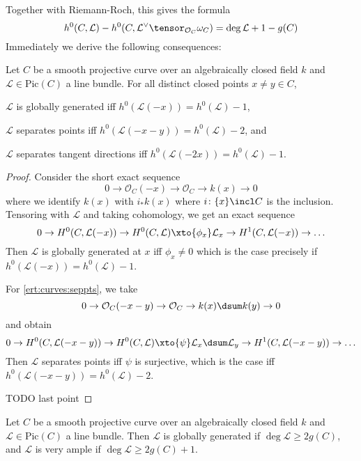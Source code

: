\documentclass[wip, algebra]{bsteffan-lecturenotes}
\newcommand{\cO}{\mathcal{O}}
\newcommand{\cL}{\mathcal{L}}
\newcommand{\Pic}{\mathrm{Pic}}
\begin{document}
Together with Riemann-Roch, this gives the formula
\begin{equation*}
	h^0(C, \cL) - h^0(C, \cL^\vee \tensor_{\cO_C} \omega_C) = \deg \cL + 1 - g(C)
\end{equation*}
Immediately we derive the following consequences:
\begin{proposition}\label{prp:curves:closedimmcriterion}
	Let $C$ be a smooth projective curve over an algebraically closed field $k$ and $\cL \in \Pic(C)$ a line bundle.
	For all distinct closed points $x \neq y \in C$, 
	\begin{alphanumerate}
		\item $\cL$ is globally generated iff $h^0(\cL(-x)) = h^0(\cL) - 1$,
		\item\label{ert:curves:seppts} $\cL$ separates points iff $h^0(\cL(-x - y)) = h^0(\cL) - 2$, and
		\item $\cL$ separates tangent directions iff $h^0(\cL(-2x)) = h^0(\cL) - 1$.
	\end{alphanumerate}
\end{proposition}
\begin{proof}
	Consider the short exact sequence
	\begin{equation*}
		0 \to \cO_C(-x) \to \cO_C \to k(x) \to 0
	\end{equation*}
	where we identify $k(x)$ with $i_* k(x)$ where $i\colon \{x\} \incl C$ is the inclusion.
	Tensoring with $\cL$ and taking cohomology, we get an exact sequence
	\begin{equation}\label{seq:curves:globgen}
		0 \to H^0(C, \cL(-x)) \to H^0(C, \cL) \xto{\phi_x} \cL_x \to H^1(C, \cL(-x)) \to \ldots
	\end{equation}
	Then $\cL$ is globally generated at $x$ iff $\phi_x \neq 0$ which is the case precisely if $h^0(\cL(-x)) = h^0(\cL) - 1$. 

	For \cref{ert:curves:seppts}, we take
	\begin{equation*}
		0 \to \cO_C(-x - y) \to \cO_C \to k(x) \dsum k(y) \to 0
	\end{equation*}
	and obtain
	\begin{equation*}
		0 \to H^0(C, \cL(-x - y)) \to H^0(C, \cL) \xto{\psi} \cL_x \dsum \cL_y \to H^1(C, \cL(-x - y)) \to \ldots
	\end{equation*}
	Then $\cL$ separates points iff $\psi$ is surjective, which is the case iff $h^0(\cL(-x - y)) = h^0(\cL) - 2$.

	TODO last point
\end{proof}
\begin{corollary}\label{cor:curves:ampledegree}
	Let $C$ be a smooth projective curve over an algebraically closed field $k$ and $\cL \in \Pic(C)$ a line bundle.
	Then $\cL$ is globally generated if $\deg \cL \geq 2g(C)$, and $\cL$ is very ample if $\deg \cL \geq 2g(C) + 1$.
\end{corollary}
\end{document}
